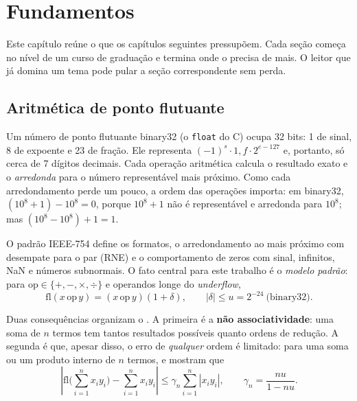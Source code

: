 \chapter{Fundamentos}\label{cap:fundamentos}

Este capítulo reúne o que os capítulos seguintes pressupõem. Cada seção começa no nível de um curso de graduação e termina onde o \vapor{} precisa de mais. O leitor que já domina um tema pode pular a seção correspondente sem perda.

\section{Aritmética de ponto flutuante}\label{sec:fp}

\begin{graduacao}
Um número de ponto flutuante binary32 (o \texttt{float} do C) ocupa 32 bits: 1 de sinal, 8 de expoente e 23 de fração. Ele representa $(-1)^s \cdot 1{,}f \cdot 2^{e-127}$ e, portanto, só cerca de 7 dígitos decimais. Cada operação aritmética calcula o resultado exato e o \emph{arredonda} para o número representável mais próximo. Como cada arredondamento perde um pouco, a ordem das operações importa: em binary32, $(10^8 + 1) - 10^8 = 0$, porque $10^8+1$ não é representável e arredonda para $10^8$; mas $(10^8 - 10^8) + 1 = 1$.
\end{graduacao}

O padrão IEEE-754 \cite{ieee754} define os formatos, o arredondamento ao mais próximo com desempate para o par (RNE) e o comportamento de zeros com sinal, infinitos, NaN e números subnormais. O fato central para este trabalho é o \emph{modelo padrão}: para $\mathrm{op} \in \{+,-,\times,\div\}$ e operandos longe do \textit{underflow},
\begin{equation}
  \mathrm{fl}(x \,\mathrm{op}\, y) = (x \,\mathrm{op}\, y)(1 + \delta), \qquad |\delta| \leq u = 2^{-24}\ \text{(binary32)}.
  \label{eq:modelo-padrao}
\end{equation}

Duas consequências organizam o \vapor{}. A primeira é a \textbf{não associatividade}: uma soma de $n$ termos tem tantos resultados possíveis quanto ordens de redução. A segunda é que, apesar disso, o erro de \emph{qualquer} ordem é limitado: para uma soma ou um produto interno de $n$ termos,  e  mostram que
\begin{equation}
  \left|\mathrm{fl}\Big(\sum_{i=1}^{n} x_i y_i\Big) - \sum_{i=1}^{n} x_i y_i\right| \leq \gamma_n \sum_{i=1}^{n} |x_i y_i|, \qquad \gamma_n = \frac{n u}{1 - n u}.
  \label{eq:gamma}
\end{equation}

